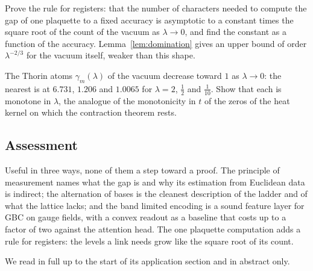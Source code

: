 \begin{problem}\label{op:registers}
Prove the rule for registers: that the number of characters needed to compute the gap of one plaquette to a fixed accuracy is asymptotic to a constant times the square root of the count of the vacuum as $\lambda\to0$, and find the constant as a function of the accuracy. Lemma~\ref{lem:domination} gives an upper bound of order $\lambda^{-2/3}$ for the vacuum itself, weaker than this shape.
\end{problem}

\begin{problem}\label{op:vacuumthorin}
The Thorin atoms $\gamma_m(\lambda)$ of the vacuum decrease toward $1$ as $\lambda\to0$: the nearest is at $6.731$, $1.206$ and $1.0065$ for $\lambda=2$, $\frac12$ and $\frac1{10}$. Show that each is monotone in $\lambda$, the analogue of the monotonicity in $t$ of the zeros of the heat kernel on which the contraction theorem rests.
\end{problem}

\subsection{Assessment}

Useful in three ways, none of them a step toward a proof. The principle of measurement names what the gap is and why its estimation from Euclidean data is indirect; the alternation of bases is the cleanest description of the ladder and of what the lattice lacks; and the band limited encoding is a sound feature layer for GBC on gauge fields, with a convex readout as a baseline that costs up to a factor of two against the attention head. The one plaquette computation adds a rule for registers: the levels a link needs grow like the square root of its count.

We read \cite{PSX23} in full up to the start of its application section and \cite{PSZ26} in abstract only.

